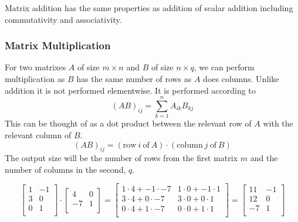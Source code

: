\documentclass[12pt]{report}
\begin{document}
\begin{flushleft}
Matrix addition has the same properties as addition of scalar addition including
commutativity and associativity.

\subsubsection*{Matrix Multiplication}

For two matrixes \(A\) of size \(m \times n\) and \(B\) of size \(n \times q\),
we can perform multiplication as \(B\) has the same number of rows as \(A\) does
columns. Unlike addition it is not performed elementwise. It is performed
according to
\[(AB)_{ij} = \sum_{k = 1}^n A_{ik}B_{kj}\]
This can be thought of as a dot product between the relevant row of \(A\) with
the relevant column of \(B\).
\[(AB)_{ij} = (\mathrm{row}\:i\:\mathrm{of}\:A) \cdot
(\mathrm{column}\:j\:\mathrm{of}\:B)\]
The output size will be the number of rows from the first matrix \(m\) and the
number of columns in the second, \(q\).

\[
    \left[\begin{array}{cc}
        1 & -1 \\
        3 & 0 \\
        0 & 1 \\
    \end{array}\right]
    \cdot
    \left[\begin{array}{cc}
        4 & 0 \\
        -7 & 1 \\
    \end{array}\right]
    =
    \left[\begin{array}{cc}
        1 \cdot 4 + -1 \cdot -7 & 1 \cdot 0 + -1 \cdot 1 \\
        3 \cdot 4 + 0 \cdot -7 & 3 \cdot 0 + 0 \cdot 1 \\
        0 \cdot 4 + 1 \cdot -7 & 0 \cdot 0 + 1 \cdot 1 \\
    \end{array}\right]
    =
    \left[\begin{array}{cc}
        11 & -1 \\
        12 & 0 \\
        -7 & 1 \\
    \end{array}\right]
\]


\end{flushleft}
\end{document}
